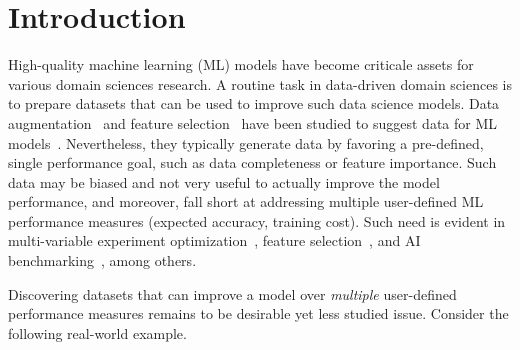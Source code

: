 \section{Introduction}
\label{sec:intro}

High-quality machine learning (ML) models have become criticale assets for various domain sciences research. 
A routine task in data-driven domain sciences is to prepare datasets that can be used to improve such data science models. 
Data augmentation~\cite{roh2019survey} and feature selection~\cite{li2017feature} have been 
studied to suggest data for ML models~\cite{doan2012principles}. 
Nevertheless, they 
typically generate data by favoring a pre-defined,  
single performance goal, such as 
data completeness or feature importance. 
Such data may be biased and not very useful to 
actually improve the model performance, 
and moreover, fall short at 
addressing multiple user-defined ML performance  
measures (\eg expected accuracy, training cost). 
Such need 
is evident in multi-variable experiment optimization~\cite{konakovic2020diversity, low2023evolution, paleyes2022challenges}, 
feature selection~\cite{li2017feature}, and
AI benchmarking~\cite{donyavi2020diverse}, among others. 

Discovering datasets that can improve 
a model 
over {\em multiple} user-defined 
performance measures remains 
to be desirable yet less studied 
issue. Consider the following real-world example. 




